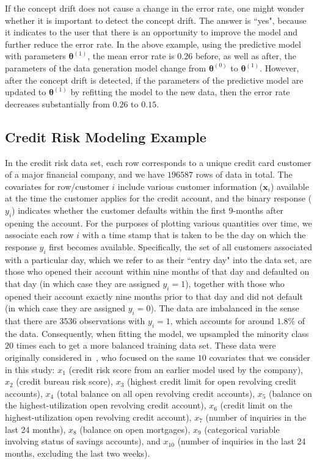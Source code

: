 \documentclass[twoside,11pt]{article}
\begin{document}
If the concept drift does not cause a change in the error rate, one might wonder whether it is important to detect the concept drift. The answer is ``yes", because it indicates to the user that there is an opportunity to improve the model and further reduce the error rate. In the above example, using the predictive model with parameters $\bm{\theta}^{(1)}$, the mean error rate is $0.26$ before, as well as after, the parameters of the data generation model change from $\bm{\theta}^{(0)}$ to $\bm{\theta}^{(1)}$. However, after the concept drift is detected, if the parameters of the predictive model are updated to $\bm{\theta}^{(1)}$ by refitting the model to the new data, then the error rate decreases substantially from $0.26$ to $0.15$. 


\subsection{Credit Risk Modeling Example}
\label{ss:cr_ds}
In the credit risk data set, each row corresponds to a unique credit card customer of a major financial company, and we have $196587$ rows of data in total. The covariates for row/customer $i$ include various customer information ($\bm {x}_i$) available at the time the customer applies for the credit account, and the binary response ($y_i$) indicates whether the customer defaults within the first $9$-months after opening the account. For the purposes of plotting various quantities over time, we associate each row $i$ with a time stamp that is taken to be the day on which the response $y_i$ first becomes available. Specifically, the set of all customers associated with a particular day, which we refer to as their ``entry day" into the data set, are those who opened their account within nine months of that day and defaulted on that day (in which case they are assigned $y_i=1$), together with those who opened their account exactly nine months prior to that day and did not default (in which case they are assigned $y_i=0$). The data are imbalanced in the sense that there are $3536$ observations with $y_i = 1$, which accounts for around $1.8\%$ of the data. Consequently, when fitting the model, we upsampled the minority class $20$ times each to get a more balanced training data set. These data were originally considered in~\cite{im2012time}, who focused on the same $10$ covariates that we consider in this study: $x_1$ (credit risk score from an earlier model used by the company), $x_2$ (credit bureau risk score), $x_3$ (highest credit limit for open revolving credit accounts), $x_4$ (total balance on all open revolving credit accounts), $x_5$ (balance on the highest-utilization open revolving credit account), $x_6$ (credit limit on the highest-utilization open revolving credit account), $x_7$ (number of inquiries in the last 24 months), $x_8$ (balance on open mortgages), $x_9$ (categorical variable involving status of savings accounts), and $x_{10}$ (number of inquiries in the last 24 months, excluding the last two weeks). 
\end{document}
